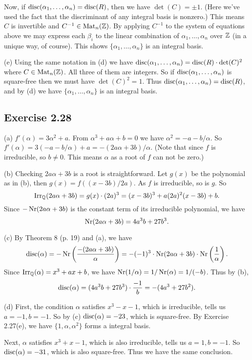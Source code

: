 \documentclass[../Marcus.tex]{subfiles}
\begin{document}
Now, if $\operatorname{disc}(\alpha_1,\ldots,\alpha_n)=\operatorname{disc}(R)$, then we have $\det(C)=\pm 1$. (Here we've used the fact that the discriminant of any integral basis is nonzero.) This means $C$ is invertible and $C^{-1}\in\operatorname{Mat}_n(\mathbb{Z})$. By applying $C^{-1}$ to the system of equations above we may express each $\beta_i$ to the linear combination of $\alpha_1,\ldots,\alpha_n$ over $\mathbb{Z}$ (in a unique way, of course). This shows $\{\alpha_1,\ldots,\alpha_n\}$ is an integral basis.

(e) Using the same notation in (d) we have $\operatorname{disc}(\alpha_1,\ldots,\alpha_n)=\operatorname{disc}(R)\cdot \det(C)^2$ where $C\in\operatorname{Mat}_n(\mathbb{Z})$. All three of them are integers. So if $\operatorname{disc}(\alpha_1,\ldots,\alpha_n)$ is square-free then we must have $\det(C)^2=1$. Thus $\operatorname{disc}(\alpha_1,\ldots,\alpha_n)=\operatorname{disc}(R)$, and by (d) we have $\{\alpha_1,\ldots,\alpha_n\}$ is an integral basis.

\subsection*{Exercise 2.28}

(a) $f'(\alpha)=3\alpha^2+a$. From $\alpha^3+a\alpha+b=0$ we have $\alpha^2=-a-b/\alpha$. So $f'(\alpha)=3(-a-b/\alpha)+a=-(2a\alpha+3b)/\alpha$. (Note that since $f$ is irreducible, so $b\neq 0$. This means $\alpha$ as a root of $f$ can not be zero.)

(b) Checking $2a\alpha+3b$ is a root is straightforward. Let $g(x)$ be the polynomial as in (b), then $g(x)=f((x-3b)/2a)$. As $f$ is irreducible, so is $g$. So 
$$
\operatorname{Irr}_{\mathbb{Q}}(2a\alpha+3b)=g(x)\cdot (2a)^3=(x-3b)^3+a(2a)^2(x-3b)+b.
$$ Since $-\operatorname{Nr}(2a\alpha+3b)$ is the constant term of its irreducible polynomial, we have
$$
\operatorname{Nr}(2a\alpha+3b)=4a^3b+27b^3.
$$

(c) By Theorem 8 (p. 19) and (a), we have 
$$
\operatorname{disc}(\alpha)=-\operatorname{Nr}\left(\frac{-(2a\alpha+3b)}{\alpha}\right)=-(-1)^3\cdot\operatorname{Nr}(2a\alpha+3b)\cdot\operatorname{Nr}\left(\frac{1}{\alpha}\right).
$$ 
Since $\operatorname{Irr}_{\mathbb{Q}}(\alpha)=x^3+ax+b$, we have $\operatorname{Nr}(1/\alpha)=1/\operatorname{Nr}(\alpha)=1/(-b)$. Thus by (b), 
$$
\operatorname{disc}(\alpha)=(4a^3b+27b^3)\cdot\frac{-1}{b}=-(4a^3+27b^2).
$$

(d) First, the condition $\alpha$ satisfies $x^3-x-1$, which is irreducible, tells us $a=-1,b=-1$. So by (c) $\operatorname{disc}(\alpha)=-23$, which is square-free. By Exercise 2.27(e), we have $\{1,\alpha,\alpha^2\}$ forms a integral basis.

Next, $\alpha$ satisfies $x^3+x-1$, which is also irreducible, tells us $a=1,b=-1$. So $\operatorname{disc}(\alpha)=-31$, which is also square-free. Thus we have the same conclusion.
\end{document}
